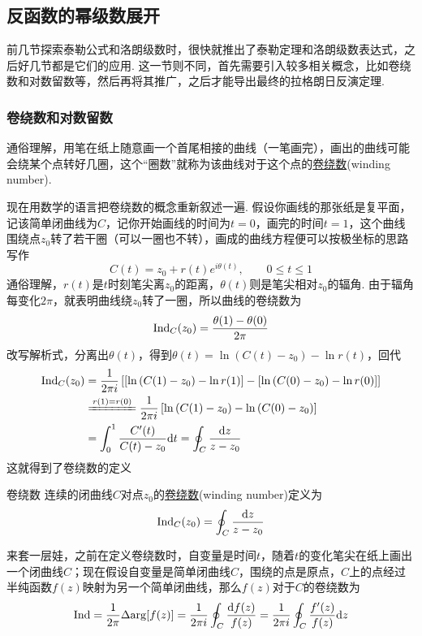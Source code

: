 \documentclass[main.tex]{subfiles}
\begin{document}
\subsection{反函数的幂级数展开}

前几节探索泰勒公式和洛朗级数时，很快就推出了泰勒定理和洛朗级数表达式，之后好几节都是它们的应用. 这一节则不同，首先需要引入较多相关概念，比如卷绕数和对数留数等，然后再将其推广，之后才能导出最终的拉格朗日反演定理.

\subsubsection{卷绕数和对数留数}

通俗理解，用笔在纸上随意画一个首尾相接的曲线（一笔画完），画出的曲线可能会绕某个点转好几圈，这个“圈数”就称为该曲线对于这个点的\uline{卷绕数}(winding number).

现在用数学的语言把卷绕数的概念重新叙述一遍. 假设你画线的那张纸是复平面，记该简单闭曲线为\(C\)，记你开始画线的时间为\(t=0\)，画完的时间\(t=1\)，这个曲线围绕点\(z_0\)转了若干圈（可以一圈也不转），画成的曲线方程便可以按极坐标的思路写作
\[C(t) = z_0 + r(t)e^{i\theta(t)}, \qquad 0 \leq t \leq 1\]
通俗理解，\(r(t)\)是\(t\)时刻笔尖离\(z_0\)的距离，\(\theta(t)\)则是笔尖相对\(z_0\)的辐角. 由于辐角每变化\(2\pi\)，就表明曲线绕\(z_0\)转了一圈，所以曲线的卷绕数为
\[ {\rm Ind}_C(z_0) = \frac{\theta(1)-\theta(0)}{2\pi} \]
改写解析式，分离出\(\theta(t)\)，得到\(\theta(t) = \ln \left(C(t) - z_0\right) - \ln r(t)\)，回代
\begin{align*}
    \trm{Ind}_C(z_0) &= \frac{1}{2\pi i}\left[\left[\ln \left(C(1) - z_0\right) - \ln r(1)\right]-\left[\ln \left(C(0) - z_0\right) - \ln r(0)\right]\right] \\
    & \xlongequal[]{r(1)=r(0)} \frac{1}{2\pi i}\left[\ln \left(C(1) - z_0\right)-\ln \left(C(0) - z_0\right)\right] \\
    & = \int_{0}^{1} \frac{C'(t)}{C(t)-z_0} \trm{d}t = \oint_{C}\frac{\trm{d}z}{z-z_0}
\end{align*}
这就得到了卷绕数的定义
\begin{definition}{卷绕数}
    连续的闭曲线\(C\)对点\(z_0\)的\uline{卷绕数}(winding number)定义为
    \[{\rm Ind}_C(z_0) = \oint_{C}\frac{{\rm d}z}{z-z_0}\]
\end{definition}

来套一层娃，之前在定义卷绕数时，自变量是时间\(t\)，随着\(t\)的变化笔尖在纸上画出一个闭曲线\(C\)；现在假设自变量是简单闭曲线\(C\)，围绕的点是原点，\(C\)上的点经过半纯函数\(f(z)\)映射为另一个简单闭曲线，那么\(f(z)\)对于\(C\)的卷绕数为
\[{\rm Ind} = \frac{1}{2\pi}\Delta{\rm arg} [f(z)] = \frac{1}{2\pi i}\oint_{C}\frac{{\rm d}f(z)}{f(z)} = \frac{1}{2\pi i}\oint_{C}\frac{f'(z)}{f(z)}{\rm d}z\]
\end{document}
